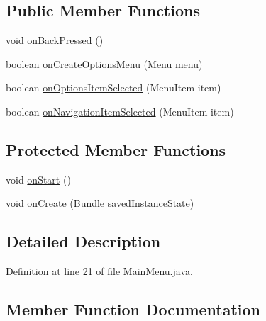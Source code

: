 \subsection*{Public Member Functions}
\begin{DoxyCompactItemize}
\item 
void \hyperlink{classcom_1_1example_1_1memorism_1_1_main_menu_a95779c69310377bd8a179729860b8378}{on\+Back\+Pressed} ()
\item 
boolean \hyperlink{classcom_1_1example_1_1memorism_1_1_main_menu_acb3ffdf12dfd08e510ce6aa55c65b52c}{on\+Create\+Options\+Menu} (Menu menu)
\item 
boolean \hyperlink{classcom_1_1example_1_1memorism_1_1_main_menu_a6af03ac2a8ca72dc6b763caab4707bad}{on\+Options\+Item\+Selected} (Menu\+Item item)
\item 
boolean \hyperlink{classcom_1_1example_1_1memorism_1_1_main_menu_a49832e3cb7178b6f317a38cd88f05bf2}{on\+Navigation\+Item\+Selected} (Menu\+Item item)
\end{DoxyCompactItemize}
\subsection*{Protected Member Functions}
\begin{DoxyCompactItemize}
\item 
void \hyperlink{classcom_1_1example_1_1memorism_1_1_main_menu_ab8ad80a15fae9ec3ade6b9ce0a108435}{on\+Start} ()
\item 
void \hyperlink{classcom_1_1example_1_1memorism_1_1_main_menu_a1739715a74237054762ff983fadeed4d}{on\+Create} (Bundle saved\+Instance\+State)
\end{DoxyCompactItemize}


\subsection{Detailed Description}


Definition at line 21 of file Main\+Menu.\+java.



\subsection{Member Function Documentation}
